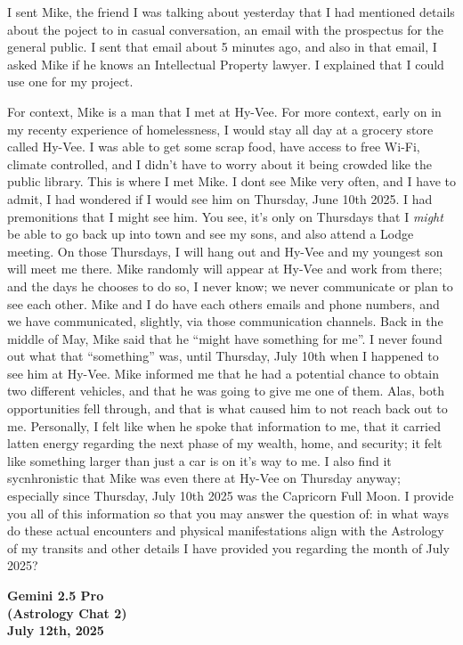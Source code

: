\documentclass{article}
\begin{document}
I sent Mike, the friend I was talking about yesterday that I had
mentioned details about the poject to in casual conversation, an email
with the prospectus for the general public. I sent that email about 5
minutes ago, and also in that email, I asked Mike if he knows an
Intellectual Property lawyer. I explained that I could use one for my
project.

For context, Mike is a man that I met at Hy-Vee. For more context, early
on in my recenty experience of homelessness, I would stay all day at a
grocery store called Hy-Vee. I was able to get some scrap food, have
access to free Wi-Fi, climate controlled, and I didn't have to worry
about it being crowded like the public library. This is where I met
Mike. I dont see Mike very often, and I have to admit, I had wondered if
I would see him on Thursday, June 10th 2025. I had premonitions that I
might see him. You see, it's only on Thursdays that I \emph{might} be
able to go back up into town and see my sons, and also attend a Lodge
meeting. On those Thursdays, I will hang out and Hy-Vee and my youngest
son will meet me there. Mike randomly will appear at Hy-Vee and work
from there; and the days he chooses to do so, I never know; we never
communicate or plan to see each other. Mike and I do have each others
emails and phone numbers, and we have communicated, slightly, via those
communication channels. Back in the middle of May, Mike said that he
``might have something for me''. I never found out what that
``something'' was, until Thursday, July 10th when I happened to see him
at Hy-Vee. Mike informed me that he had a potential chance to obtain two
different vehicles, and that he was going to give me one of them. Alas,
both opportunities fell through, and that is what caused him to not
reach back out to me. Personally, I felt like when he spoke that
information to me, that it carried latten energy regarding the next
phase of my wealth, home, and security; it felt like something larger
than just a car is on it's way to me. I also find it sycnhronistic that
Mike was even there at Hy-Vee on Thursday anyway; especially since
Thursday, July 10th 2025 was the Capricorn Full Moon. I provide you all
of this information so that you may answer the question of: in what ways
do these actual encounters and physical manifestations align with the
Astrology of my transits and other details I have provided you regarding
the month of July 2025?

\begin{center}
\textbf{Gemini 2.5 Pro} \\
\textbf{(Astrology Chat 2)} \\
\textbf{July 12th, 2025}
\end{center}
\end{document}
